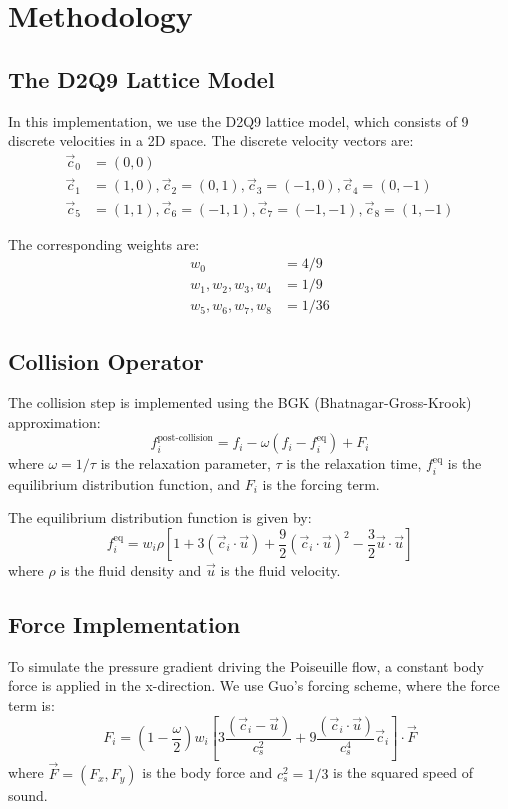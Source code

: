 \documentclass[12pt]{article}
\begin{document}
\section{Methodology}
\subsection{The D2Q9 Lattice Model}
In this implementation, we use the D2Q9 lattice model, which consists of 9 discrete velocities in a 2D space. The discrete velocity vectors are:
\begin{align}
\vec{c}_0 &= (0, 0)\\
\vec{c}_1 &= (1, 0), \vec{c}_2 = (0, 1), \vec{c}_3 = (-1, 0), \vec{c}_4 = (0, -1)\\
\vec{c}_5 &= (1, 1), \vec{c}_6 = (-1, 1), \vec{c}_7 = (-1, -1), \vec{c}_8 = (1, -1)
\end{align}

The corresponding weights are:
\begin{align}
w_0 &= 4/9\\
w_1, w_2, w_3, w_4 &= 1/9\\
w_5, w_6, w_7, w_8 &= 1/36
\end{align}

\subsection{Collision Operator}
The collision step is implemented using the BGK (Bhatnagar-Gross-Krook) approximation:
\begin{equation}
f_i^{\text{post-collision}} = f_i - \omega (f_i - f_i^{\text{eq}}) + F_i
\end{equation}
where $\omega = 1/\tau$ is the relaxation parameter, $\tau$ is the relaxation time, $f_i^{\text{eq}}$ is the equilibrium distribution function, and $F_i$ is the forcing term.

The equilibrium distribution function is given by:
\begin{equation}
f_i^{\text{eq}} = w_i \rho \left[1 + 3(\vec{c}_i \cdot \vec{u}) + \frac{9}{2}(\vec{c}_i \cdot \vec{u})^2 - \frac{3}{2}\vec{u} \cdot \vec{u}\right]
\end{equation}
where $\rho$ is the fluid density and $\vec{u}$ is the fluid velocity.

\subsection{Force Implementation}
To simulate the pressure gradient driving the Poiseuille flow, a constant body force is applied in the x-direction. We use Guo's forcing scheme, where the force term is:
\begin{equation}
F_i = (1 - \frac{\omega}{2}) w_i \left[3 \frac{(\vec{c}_i - \vec{u})}{c_s^2} + 9 \frac{(\vec{c}_i \cdot \vec{u})}{c_s^4} \vec{c}_i\right] \cdot \vec{F}
\end{equation}
where $\vec{F} = (F_x, F_y)$ is the body force and $c_s^2 = 1/3$ is the squared speed of sound.
\end{document}
